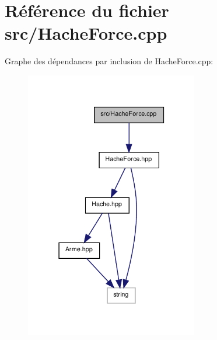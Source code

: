 \section{Référence du fichier src/\-Hache\-Force.cpp}
\label{_hache_force_8cpp}
Graphe des dépendances par inclusion de Hache\-Force.\-cpp\-:\nopagebreak
\begin{figure}[H]
\begin{center}
\leavevmode
\includegraphics[width=214pt]{_hache_force_8cpp__incl}
\end{center}
\end{figure}
